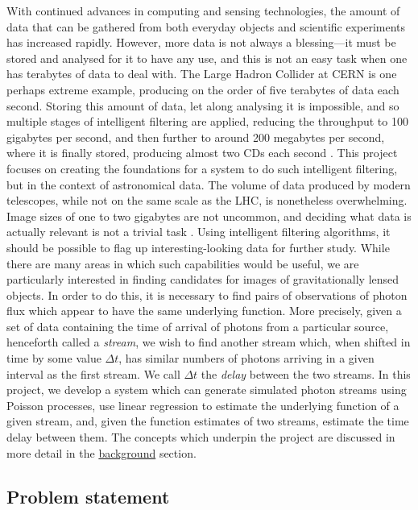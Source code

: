 \documentclass[a4paper,11pt]{article}
\begin{document}
With continued advances in computing and sensing technologies, the amount of data that can be gathered from both everyday objects and scientific experiments has increased rapidly. However, more data is not always a blessing---it must be stored and analysed for it to have any use, and this is not an easy task when one has terabytes of data to deal with. The Large Hadron Collider at CERN is one perhaps extreme example, producing on the order of five terabytes of data each second. Storing this amount of data, let along analysing it is impossible, and so multiple stages of intelligent filtering are applied, reducing the throughput to 100 gigabytes per second, and then further to around 200 megabytes per second, where it is finally stored, producing almost two CDs each second \cite{WLCGproc}. This project focuses on creating the foundations for a system to do such intelligent filtering, but in the context of astronomical data. The volume of data produced by modern telescopes, while not on the same scale as the LHC, is nonetheless overwhelming. Image sizes of one to two gigabytes are not uncommon, and deciding what data is actually relevant is not a trivial task \cite{starck2002handbook}. Using intelligent filtering algorithms, it should be possible to flag up interesting-looking data for further study. While there are many areas in which such capabilities would be useful, we are particularly interested in finding candidates for images of gravitationally lensed objects. In order to do this, it is necessary to find pairs of observations of photon flux which appear to have the same underlying function. More precisely, given a set of data containing the time of arrival of photons from a particular source, henceforth called a \emph{stream}, we wish to find another stream which, when shifted in time by some value $\Delta t$, has similar numbers of photons arriving in a given interval as the first stream. We call $\Delta t$ the \emph{delay} between the two streams. In this project, we develop a system which can generate simulated photon streams using Poisson processes, use linear regression to estimate the underlying function of a given stream, and, given the function estimates of two streams, estimate the time delay between them. The concepts which underpin the project are discussed in more detail in the \hyperref[sec-2]{background} section.
\subsection{Problem statement}
\label{sec-1-1}
\end{document}
